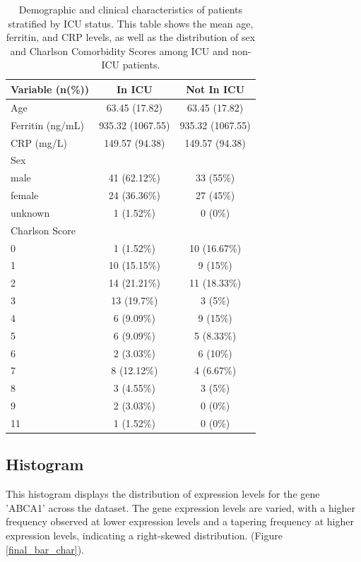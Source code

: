 \documentclass[12pt]{article}
\begin{document}
\begin{table}[H]
\centering
\begin{tabular}{lcc}
\toprule
Variable (n(\%)) & In ICU & Not In ICU\\
\midrule
Age & 63.45 (17.82) & 63.45 (17.82)\\
Ferritin (ng/mL) & 935.32 (1067.55) & 935.32 (1067.55)\\
CRP (mg/L) & 149.57 (94.38) & 149.57 (94.38)\\
\addlinespace
\midrule
Sex &  & \\
\midrule
male & 41 (62.12\%) & 33 (55\%)\\
female & 24 (36.36\%) & 27 (45\%)\\
unknown & 1 (1.52\%) & 0 (0\%)\\
\midrule
Charlson Score &  & \\
\midrule
0 & 1 (1.52\%) & 10 (16.67\%)\\
1 & 10 (15.15\%) & 9 (15\%)\\
2 & 14 (21.21\%) & 11 (18.33\%)\\
3 & 13 (19.7\%) & 3 (5\%)\\
4 & 6 (9.09\%) & 9 (15\%)\\
5 & 6 (9.09\%) & 5 (8.33\%)\\
6 & 2 (3.03\%) & 6 (10\%)\\
7 & 8 (12.12\%) & 4 (6.67\%)\\
8 & 3 (4.55\%) & 3 (5\%)\\
9 & 2 (3.03\%) & 0 (0\%)\\
11 & 1 (1.52\%) & 0 (0\%)\\
\bottomrule
\end{tabular}

\caption{Demographic and clinical characteristics of patients stratified by ICU status. This table shows the mean age, ferritin, and CRP levels, as well as the distribution of sex and Charlson Comorbidity Scores among ICU and non-ICU patients.}
\label{summary table}
\end{table}

\subsection{Histogram}
This histogram displays the distribution of expression levels for the gene 'ABCA1' across the dataset. The gene expression levels are varied, with a higher frequency observed at lower expression levels and a tapering frequency at higher expression levels, indicating a right-skewed distribution. (Figure \ref{final_bar_char}).
\end{document}
